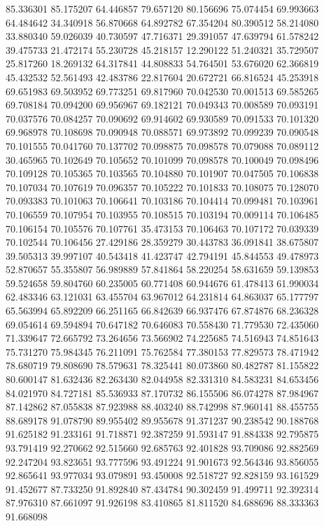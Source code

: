 85.336301
85.175207
64.446857
79.657120
80.156696
75.074454
69.993663
64.484642
34.340918
56.870668
64.892782
67.354204
80.390512
58.214080
33.880340
59.026039
40.730597
47.716371
29.391057
47.639794
61.578242
39.475733
21.472174
55.230728
45.218157
12.290122
51.240321
35.729507
25.817260
18.269132
64.317841
44.808833
54.764501
53.676020
62.366819
45.432532
52.561493
42.483786
22.817604
20.672721
66.816524
45.253918
69.651983
69.503952
69.773251
69.817960
70.042530
70.001513
69.585265
69.708184
70.094200
69.956967
69.182121
70.049343
70.008589
70.093191
70.037576
70.084257
70.090692
69.914602
69.930589
70.091533
70.101320
69.968978
70.108698
70.090948
70.088571
69.973892
70.099239
70.090548
70.101555
70.041760
70.137702
70.098875
70.098578
70.079088
70.089112
30.465965
70.102649
70.105652
70.101099
70.098578
70.100049
70.098496
70.109128
70.105365
70.103565
70.104880
70.101907
70.047505
70.106838
70.107034
70.107619
70.096357
70.105222
70.101833
70.108075
70.128070
70.093383
70.101063
70.106641
70.103186
70.104414
70.099481
70.103961
70.106559
70.107954
70.103955
70.108515
70.103194
70.009114
70.106485
70.106154
70.105576
70.107761
35.473153
70.106463
70.107172
70.039339
70.102544
70.106456
27.429186
28.359279
30.443783
36.091841
38.675807
39.505313
39.997107
40.543418
41.423747
42.794191
45.844553
49.478973
52.870657
55.355807
56.989889
57.841864
58.220254
58.631659
59.139853
59.524658
59.804760
60.235005
60.771408
60.944676
61.478413
61.990034
62.483346
63.121031
63.455704
63.967012
64.231814
64.863037
65.177797
65.563994
65.892209
66.251165
66.842639
66.937476
67.874876
68.236328
69.054614
69.594894
70.647182
70.646083
70.558430
71.779530
72.435060
71.339647
72.665792
73.264656
73.566902
74.225685
74.516943
74.851643
75.731270
75.984345
76.211091
75.762584
77.380153
77.829573
78.471942
78.680719
79.808690
78.579631
78.325441
80.073860
80.482787
81.155822
80.600147
81.632436
82.263430
82.044958
82.331310
84.583231
84.653456
84.021970
84.727181
85.536933
87.170732
86.155506
86.074278
87.984967
87.142862
87.055838
87.923988
88.403240
88.742998
87.960141
88.455755
88.689178
91.078790
89.955402
89.955678
91.371237
90.238542
90.188768
91.625182
91.233161
91.718871
92.387259
91.593147
91.884338
92.795875
93.791419
92.270662
92.515660
92.685763
92.401828
93.709086
92.882569
92.247204
93.823651
93.777596
93.491224
91.901673
92.564346
93.856055
92.865641
93.977034
93.079891
93.450008
92.518727
92.828159
93.161529
91.452677
87.733250
91.892840
87.434784
90.302459
91.499711
92.392314
87.976310
87.661097
91.926198
83.410865
81.811520
84.688696
88.333363
91.668098
